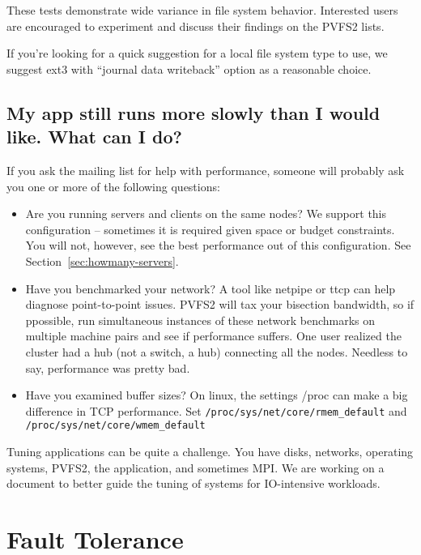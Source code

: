 \documentclass[11pt,letterpaper]{article}
\begin{document}
These tests demonstrate wide variance in file system behavior.
Interested users are encouraged to experiment and discuss their
findings on the PVFS2 lists.

If you're looking for a quick suggestion for a local file system type
to use, we suggest ext3 with ``journal data writeback'' option as a
reasonable choice.

\subsection{My app still runs more slowly than I would like.  What can I do?}
\label{sec:tuning}

If you ask the mailing list for help with performance, someone will probably
ask you one or more of the following questions:

\begin{itemize}

\item Are you running servers and clients on the same nodes?  We support this
      configuration -- sometimes it is required given space or budget
      constraints.  You will not, however, see the best performance out of this
      configuration.  See Section~\ref{sec:howmany-servers}. 

\item Have you benchmarked your network?  A tool like netpipe or ttcp can help
      diagnose point-to-point issues.  PVFS2 will tax your bisection bandwidth,
      so if ppossible, run simultaneous instances of these network benchmarks
      on multiple machine pairs and see if performance suffers.  One user
      realized the cluster had a hub (not a switch, a hub) connecting all the
      nodes.  Needless to say, performance was pretty bad. 

\item Have you examined buffer sizes?  On linux, the settings /proc can make a
      big difference in TCP performance.  Set
      \texttt{/proc/sys/net/core/rmem\_default} and
      \texttt{/proc/sys/net/core/wmem\_default} 

\end{itemize}

Tuning applications can be quite a challenge.  You have disks, networks,
operating systems, PVFS2, the application, and sometimes MPI.  We are
working on a document to better guide the tuning of systems for
IO-intensive workloads.


%
%
\section{Fault Tolerance}
\label{sec:fault-tolerance}
\end{document}
